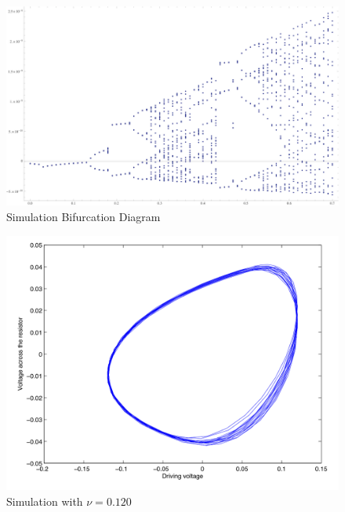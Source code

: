 \documentclass[12pt]{report}
\begin{document}
	\begin{figure}[h]
		\centering
		\includegraphics{simulations/circuit.png}
		\caption{Simulation Bifurcation Diagram}
		\label{fig: Simulation Bifurcation Diagram}
	\end{figure}

	\begin{figure}
		\centering
		\includegraphics{simulations/plotnu0120.png}
		\caption{Simulation with $\nu=0.120$}
		\label{fig:sim.0120}
	\end{figure}
	
\end{document}
